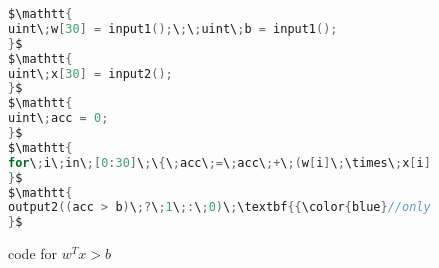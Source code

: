 
\begin{figure}
\begin{lstlisting}[language=C,mathescape=true]
$\mathtt{
uint\;w[30] = input1();\;\;uint\;b = input1();
}$
$\mathtt{
uint\;x[30] = input2();
}$
$\mathtt{
uint\;acc = 0;
}$
$\mathtt{
for\;i\;in\;[0:30]\;\{\;acc\;=\;acc\;+\;(w[i]\;\times\;x[i]);\;\}
}$
$\mathtt{
output2((acc > b)\;?\;1\;:\;0)\;\textbf{{\color{blue}//only to party 2}}
}$
\end{lstlisting}
\caption{\tool code for $w^Tx >b$}
\label{fig:ex-sml}
\end{figure}

